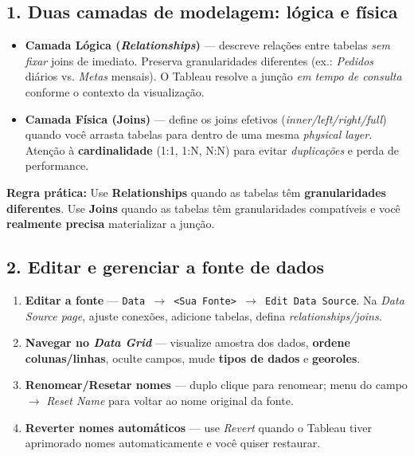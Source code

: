 \subsection*{1. Duas camadas de modelagem: lógica e física}
\begin{itemize}[leftmargin=*]
  \item \textbf{Camada Lógica (\textit{Relationships})} — descreve relações entre tabelas \emph{sem fixar} joins de imediato.  
  Preserva granularidades diferentes (ex.: \textit{Pedidos} diários vs. \textit{Metas} mensais). O Tableau resolve a junção \textit{em tempo de consulta} conforme o contexto da visualização.
  \item \textbf{Camada Física (Joins)} — define os joins efetivos (\textit{inner/left/right/full}) quando você arrasta tabelas para dentro de uma mesma \textit{physical layer}.  
  Atenção à \textbf{cardinalidade} (1:1, 1:N, N:N) para evitar \textit{duplicações} e perda de performance.
\end{itemize}

\begin{NoteBox}
\textbf{Regra prática:} Use \textbf{Relationships} quando as tabelas têm \textbf{granularidades diferentes}. Use \textbf{Joins} quando as tabelas têm granularidades compatíveis e você \textbf{realmente precisa} materializar a junção.
\end{NoteBox}

\subsection*{2. Editar e gerenciar a fonte de dados}
\begin{enumerate}[leftmargin=*]
  \item \textbf{Editar a fonte} — \texttt{Data \(\rightarrow\) <Sua Fonte> \(\rightarrow\) Edit Data Source}.  
  Na \textit{Data Source page}, ajuste conexões, adicione tabelas, defina \textit{relationships/joins}.
  \item \textbf{Navegar no \textit{Data Grid}} — visualize amostra dos dados, \textbf{ordene colunas/linhas}, oculte campos, mude \textbf{tipos de dados} e \textbf{georoles}.
  \item \textbf{Renomear/Resetar nomes} — duplo clique para renomear; menu do campo \(\rightarrow\) \textit{Reset Name} para voltar ao nome original da fonte.
  \item \textbf{Reverter nomes automáticos} — use \textit{Revert} quando o Tableau tiver aprimorado nomes automaticamente e você quiser restaurar.
\end{enumerate}

